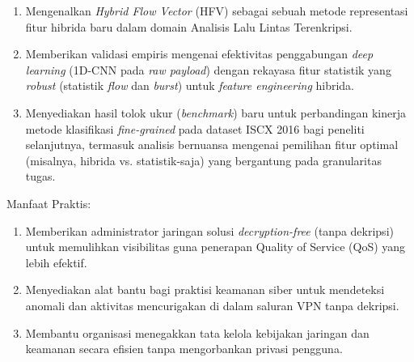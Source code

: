 \begin{enumerate}
    \item Mengenalkan \textit{Hybrid Flow Vector} (HFV) sebagai sebuah metode representasi fitur hibrida baru dalam domain Analisis Lalu Lintas Terenkripsi.

    \item Memberikan validasi empiris mengenai efektivitas penggabungan \textit{deep learning} (1D-CNN pada \textit{raw payload}) dengan rekayasa fitur statistik yang \textit{robust} (statistik \textit{flow} dan \textit{burst}) untuk \textit{feature engineering} hibrida.

    \item Menyediakan hasil tolok ukur (\textit{benchmark}) baru untuk perbandingan kinerja metode klasifikasi \textit{fine-grained} pada dataset ISCX 2016 bagi peneliti selanjutnya, termasuk analisis bernuansa mengenai pemilihan fitur optimal (misalnya, hibrida vs. statistik-saja) yang bergantung pada granularitas tugas.
\end{enumerate}

Manfaat Praktis:

\begin{enumerate}
    \item Memberikan administrator jaringan solusi \textit{decryption-free} (tanpa dekripsi) untuk memulihkan visibilitas guna penerapan Quality of Service (QoS) yang lebih efektif.

    \item Menyediakan alat bantu bagi praktisi keamanan siber untuk mendeteksi anomali dan aktivitas mencurigakan di dalam saluran VPN tanpa dekripsi.

    \item Membantu organisasi menegakkan tata kelola kebijakan jaringan dan keamanan secara efisien tanpa mengorbankan privasi pengguna.
\end{enumerate}

